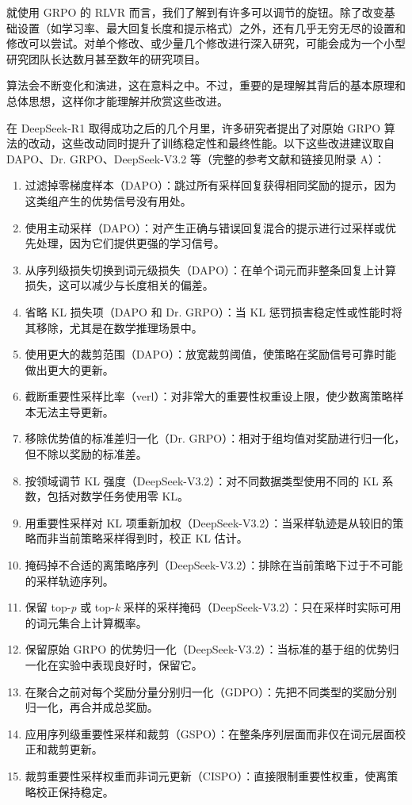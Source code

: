 
就使用 GRPO 的 RLVR 而言，我们了解到有许多可以调节的旋钮。除了改变基础设置（如学习率、最大回复长度和提示格式）之外，还有几乎无穷无尽的设置和修改可以尝试。对单个修改、或少量几个修改进行深入研究，可能会成为一个小型研究团队长达数月甚至数年的研究项目。

算法会不断变化和演进，这在意料之中。不过，重要的是理解其背后的基本原理和总体思想，这样你才能理解并欣赏这些改进。

在 DeepSeek-R1 取得成功之后的几个月里，许多研究者提出了对原始 GRPO 算法的改动，这些改动同时提升了训练稳定性和最终性能。以下这些改进建议取自 DAPO、Dr. GRPO、DeepSeek-V3.2 等（完整的参考文献和链接见附录 A）：

\begin{enumerate}
\item 过滤掉零梯度样本（DAPO）：跳过所有采样回复获得相同奖励的提示，因为这类组产生的优势信号没有用处。
\item 使用主动采样（DAPO）：对产生正确与错误回复混合的提示进行过采样或优先处理，因为它们提供更强的学习信号。
\item 从序列级损失切换到词元级损失（DAPO）：在单个词元而非整条回复上计算损失，这可以减少与长度相关的偏差。
\item 省略 KL 损失项（DAPO 和 Dr. GRPO）：当 KL 惩罚损害稳定性或性能时将其移除，尤其是在数学推理场景中。
\item 使用更大的裁剪范围（DAPO）：放宽裁剪阈值，使策略在奖励信号可靠时能做出更大的更新。
\item 截断重要性采样比率（verl）：对非常大的重要性权重设上限，使少数离策略样本无法主导更新。
\item 移除优势值的标准差归一化（Dr. GRPO）：相对于组均值对奖励进行归一化，但不除以奖励的标准差。
\item 按领域调节 KL 强度（DeepSeek-V3.2）：对不同数据类型使用不同的 KL 系数，包括对数学任务使用零 KL。
\item 用重要性采样对 KL 项重新加权（DeepSeek-V3.2）：当采样轨迹是从较旧的策略而非当前策略采样得到时，校正 KL 估计。
\item 掩码掉不合适的离策略序列（DeepSeek-V3.2）：排除在当前策略下过于不可能的采样轨迹序列。
\item 保留 top-\emph{p} 或 top-\emph{k} 采样的采样掩码（DeepSeek-V3.2）：只在采样时实际可用的词元集合上计算概率。
\item 保留原始 GRPO 的优势归一化（DeepSeek-V3.2）：当标准的基于组的优势归一化在实验中表现良好时，保留它。
\item 在聚合之前对每个奖励分量分别归一化（GDPO）：先把不同类型的奖励分别归一化，再合并成总奖励。
\item 应用序列级重要性采样和裁剪（GSPO）：在整条序列层面而非仅在词元层面校正和裁剪更新。
\item 裁剪重要性采样权重而非词元更新（CISPO）：直接限制重要性权重，使离策略校正保持稳定。
\end{enumerate}

